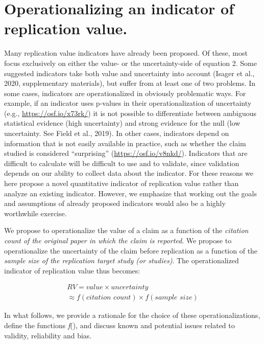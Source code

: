 \documentclass[
  english,
  jou,floatsintext]{apa6}
\begin{document}
\hypertarget{operationalizing-an-indicator-of-replication-value.}{%
\section{Operationalizing an indicator of replication value.}\label{operationalizing-an-indicator-of-replication-value.}}

Many replication value indicators have already been proposed. Of these, most focus exclusively on either the value- or the uncertainty-side of equation 2. Some suggested indicators take both value and uncertainty into account (Isager et al., 2020, supplementary materials), but suffer from at least one of two problems. In some cases, indicators are operationalized in obviously problematic ways. For example, if an indicator uses p-values in their operationalization of uncertainty (e.g., \url{https://osf.io/x73rk/}) it is not possible to differentiate between ambiguous statistical evidence (high uncertainty) and strong evidence for the null (low uncertainty. See Field et al., 2019). In other cases, indicators depend on information that is not easily available in practice, such as whether the claim studied is considered ``surprising'' (\url{https://osf.io/v8nkd/}). Indicators that are difficult to calculate will be difficult to use and to validate, since validation depends on our ability to collect data about the indicator. For these reasons we here propose a novel quantitative indicator of replication value rather than analyze an existing indicator. However, we emphasize that working out the goals and assumptions of already proposed indicators would also be a highly worthwhile exercise.

We propose to operationalize the value of a claim as a function of the \emph{citation count of the original paper in which the claim is reported}. We propose to operationalize the uncertainty of the claim before replication as a function of the \emph{sample size of the replication target study (or studies)}. The operationalized indicator of replication value thus becomes:

\begin{equation} 
  \tag{3}
  \begin{split} 
  RV=value\times uncertainty \\
  \approx f(\textit{citation count}) \times f(\textit{sample size})
  \end{split}
  \label{eq:3}
\end{equation}

In what follows, we provide a rationale for the choice of these operationalizations, define the functions \emph{f}(), and discuss known and potential issues related to validity, reliability and bias.
\end{document}
